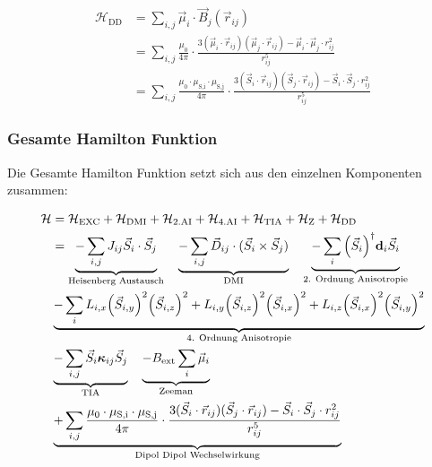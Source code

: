 \documentclass[main.tex]{subfiles}
\begin{document}

\begin{align}
	\mathcal{H}_{\text{DD}} 
	& = \sum_{i,j} \vec{\mu}_i \cdot \vec{B}_j(\vec{r}_{ij}) \nonumber \\
	& = \sum_{i,j} \frac{\mu_0}{4\pi}
	\cdot \frac{3(\vec{\mu}_i \cdot \vec{r}_{ij})(\vec{\mu}_j \cdot \vec{r}_{ij})
	- \vec{\mu}_i \cdot \vec{\mu}_j \cdot r_{ij}^2}{r_{ij}^5} \nonumber \\
	& = \sum_{i,j} \frac{\mu_0 \cdot \mu_{\text{S,i}} \cdot \mu_{\text{S,j}}}{4\pi}
	\cdot \frac{3(\vec{S}_i \cdot \vec{r}_{ij})(\vec{S}_j \cdot \vec{r}_{ij})
	- \vec{S}_i \cdot \vec{S}_j \cdot r_{ij}^2}{r_{ij}^5}\label{eq:hamilton-dd}
\end{align}

\subsubsection*{Gesamte Hamilton Funktion}

Die Gesamte Hamilton Funktion setzt sich aus den einzelnen Komponenten zusammen:

\begin{align}
	\mathcal{H} & = \mathcal{H}_{\text{EXC}} + \mathcal{H}_{\text{DMI}} +
	\mathcal{H}_{\text{2.AI}} + \mathcal{H}_{\text{4.AI}} +
	\mathcal{H}_{\text{TIA}} + \mathcal{H}_{\text{Z}} +
	\mathcal{H}_{\text{DD}}\label{eq:hamilton}\nonumber \\
	& = \underbrace{-\sum_{i,j} J_{ij} \vec{S}_i \cdot \vec{S}_j}_\text{Heisenberg Austausch} %
	\quad \underbrace{-\sum_{i,j} \vec{D}_{ij} \cdot (\vec{S}_i \times \vec{S}_j)}_\text{DMI} %
	\quad \underbrace{-\sum_{i} \qty(\vec{S}_i)^\dagger \mat{d}_i \vec{S}_i}_\text{2. Ordnung Anisotropie}\nonumber  \\ %
	& \underbrace{-\sum_{i} L_{i,x} \qty(\vec{S}_{i,y})^2 \qty(\vec{S}_{i,z})^2 + L_{i,y} \qty(\vec{S}_{i,z})^2 \qty(\vec{S}_{i,x})^2 + L_{i,z} \qty(\vec{S}_{i,x})^2 \qty(\vec{S}_{i,y})^2}_\text{4. Ordnung Anisotropie} \nonumber\\ %
	& \underbrace{-\sum_{i,j} \vec{S}_i \mat{\kappa}_{ij} \vec{S}_j}_\text{TIA}%
	\quad \underbrace{- B_\text{ext} \sum_{i} \vec{\mu}_i}_\text{Zeeman} \nonumber\\ %
	& \underbrace{ + \sum_{i,j} \frac{\mu_0 \cdot \mu_{\text{S,i}} \cdot \mu_{\text{S,j}}}{4\pi} \cdot \frac{3(\vec{S}_i \cdot \vec{r}_{ij})(\vec{S}_j \cdot \vec{r}_{ij}) - \vec{S}_i \cdot \vec{S}_j \cdot r_{ij}^2}{r_{ij}^5}}_\text{Dipol Dipol Wechselwirkung} %
\end{align}
\end{document}
